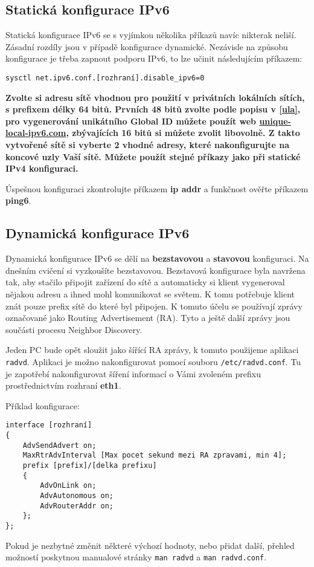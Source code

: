 \documentclass[a4paper,11pt,draft]{article}
\begin{document}
\subsection{Statická konfigurace IPv6}
Statická konfigurace IPv6 se s vyjímkou několika příkazů navíc nikterak neliší.
Zásadní rozdíly jsou v případě konfigurace dynamické. Nezávisle na způsobu
konfigurace je třeba zapnout podporu IPv6, to lze učinit následujícím příkazem:
\begin{verbatim}
sysctl net.ipv6.conf.[rozhraní].disable_ipv6=0
\end{verbatim}

{\bf Zvolte si adresu sítě vhodnou pro použití v privátních lokálních sítích, s
prefixem délky 64 bitů. Prvních 48 bitů zvolte podle popisu v \ref{ula}, pro
vygenerování unikátního Global ID můžete použít web
\url{unique-local-ipv6.com}, zbývajících 16 bitů si můžete zvolit libovolně.  Z
takto vytvořené sítě si vyberte 2 vhodné adresy, které nakonfigurujte na
koncové uzly Vaší sítě. Můžete použít stejné příkazy jako při statické IPv4
konfiguraci.}

Úspešnou konfiguraci zkontrolujte příkazem {\bf ip addr} a funkčnost ověřte
příkazem {\bf ping6}.

\subsection{Dynamická konfigurace IPv6}
Dynamická konfigurace IPv6 se dělí na {\bf bezstavovou} a {\bf stavovou}
konfiguraci. Na dnešním cvičení si vyzkoušíte bezstavovou. Bezstavová
konfigurace byla navržena tak, aby stačilo připojit zařízení do sítě a
automaticky si klient vygeneroval nějakou adresu a ihned mohl komunikovat se
světem. K tomu potřebuje klient znát pouze prefix sítě do které byl připojen. K
tomuto účelu se používají zprávy označované jako Routing Advertisement (RA).
Tyto a ještě další zprávy jsou součásti procesu Neighbor Discovery.

Jeden PC bude opět sloužit jako  šířící RA zprávy, k tomuto
použijeme aplikaci {\tt radvd}. Aplikaci je možno nakonfigurovat pomocí souboru
{\tt /etc/radvd.conf}. Tu je zapotřebí nakonfigurovat šíření informací o Vámi
zvoleném prefixu prostřednictvím rozhraní {\bf eth1}.

Příklad konfigurace:
\begin{verbatim}
interface [rozhraní]
{
    AdvSendAdvert on;
    MaxRtrAdvInterval [Max pocet sekund mezi RA zpravami, min 4];
    prefix [prefix]/[delka prefixu]
    {
        AdvOnLink on;
        AdvAutonomous on;
        AdvRouterAddr on;
    };
};
\end{verbatim}
Pokud je nezbytné změnit některé výchozí hodnoty, nebo přidat další, přehled
možností poskytnou manualové stránky {\tt man radvd} a {\tt man radvd.conf}.
\end{document}
